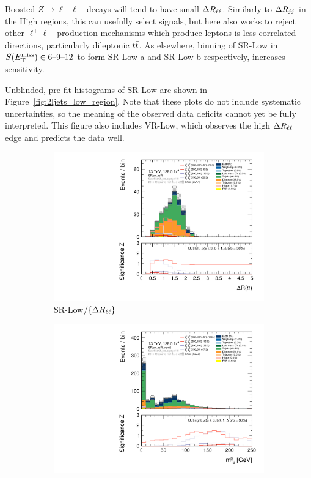 Boosted $Z\rightarrow \ell^+\ell^-$ decays will tend to have small $\Delta R_{\ell\ell}$.
Similarly to $\Delta R_{jj}$ in the High regions, this can usefully select signals,
but here also works to reject other $\ell^+\ell^-$ production mechanisms which
produce leptons is less correlated directions, particularly dileptonic
$t\bar t$.
As elsewhere, binning of SR-Low in $S(E_\mathrm{T}^\mathrm{miss}) \in 6\textrm{--}9\textrm{--}12$
to form SR-Low-a and SR-Low-b respectively, increases sensitivity.

Unblinded, pre-fit histograms of SR-Low are shown in
Figure~\ref{fig:2ljets_low_region}.
Note that these plots do not include systematic uncertainties, so the meaning
of the observed data deficits cannot yet be fully interpreted.
This figure also includes VR-Low, which observes the high $\Delta R_{\ell\ell}$ edge and
predicts the data well.

\begin{figure}[tp]
\centering
\begin{subfigure}{0.48\textwidth}
\centering
\includegraphics[width=\textwidth]{figures/2ljets_low_Rll_SRLow_noRll.pdf}
\caption{SR-Low$/\{\Delta R_{\ell\ell}\}$}
\end{subfigure}
\hfill
\begin{subfigure}{0.48\textwidth}
\centering
\includegraphics[width=\textwidth]{figures/2ljets_low_mt2leplsp_0_SRLow_noRll_nomt2.pdf}

\end{subfigure}
\end{figure}
